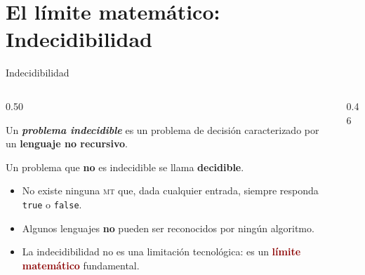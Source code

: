 \documentclass[aspectratio=1610, 12pt]{beamer}
\newcommand{\MT}{\textsc{mt}}
\begin{document}
\section{El límite matemático: Indecidibilidad}
\begin{frame}[t]{Indecidibilidad}
\vspace{2pt} %
\begin{columns}[T]

  \begin{column}{0.50\textwidth}
    \begin{defbox}
      \small
      Un \emph{\textbf{problema indecidible}} es un problema de decisión
      caracterizado por un \textbf{lenguaje no recursivo}.

      \vspace{2pt} %
      Un problema que \textbf{no} es indecidible se llama \textbf{decidible}.
    \end{defbox}

    \vspace{3pt} %
    \small %
    \begin{itemize}\setlength{\itemsep}{3pt} %
      \item No existe ninguna \MT{} que, dada cualquier entrada,
        siempre responda \texttt{true} o \texttt{false}.
      \item Algunos lenguajes \textbf{no} pueden ser reconocidos
        por ningún algoritmo.
      \item La indecidibilidad no es una limitación tecnológica:
        es un \textcolor{DarkRed}{\textbf{límite matemático}} fundamental.
    \end{itemize}
  \end{column}

  \begin{column}{0.46\textwidth}
    \begin{defbox}
      \footnotesize
      \begin{center}
\end{center}
\end{defbox}
\end{column}
\end{columns}
\end{frame}
\end{document}

